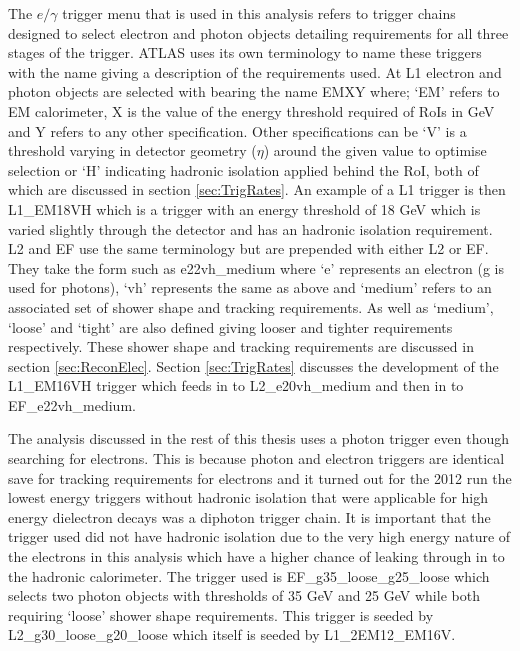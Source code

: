 		The $e/\gamma$ trigger menu that is used in this analysis refers to trigger chains designed to select electron and photon objects detailing requirements for all three stages of the trigger. ATLAS uses its own terminology to name these triggers with the name giving a description of the requirements used. At L1 electron and photon objects are selected with bearing the name EMXY where; `EM' refers to EM calorimeter, X is the value of the energy threshold required of RoIs in GeV and Y refers to any other specification. Other specifications can be `V' is a threshold varying in detector geometry ($\eta$) around the given value to optimise selection or `H' indicating hadronic isolation applied behind the RoI, both of which are discussed in section \ref{sec:TrigRates}. An example of a L1 trigger is then L1\_EM18VH which is a trigger with an energy threshold of 18 GeV which is varied slightly through the detector and has an hadronic isolation requirement. L2 and EF use the same terminology but are prepended with either L2 or EF. They take the form such as e22vh\_medium where `e' represents an electron (g is used for photons), `vh' represents the same as above and `medium' refers to an associated set of shower shape and tracking requirements. As well as `medium', `loose' and `tight' are also defined giving looser and tighter requirements respectively. These shower shape and tracking requirements are discussed in section \ref{sec:ReconElec}. Section \ref{sec:TrigRates} discusses the development of the L1\_EM16VH trigger which feeds in to L2\_e20vh\_medium and then in to EF\_e22vh\_medium. 

		The analysis discussed in the rest of this thesis uses a photon trigger even though searching for electrons. This is because photon and electron triggers are identical save for tracking requirements for electrons and it turned out for the 2012 run the lowest energy triggers without hadronic isolation that were applicable for high energy dielectron decays was a diphoton trigger chain. It is important that the trigger used did not have hadronic isolation due to the very high energy nature of the electrons in this analysis which have a higher chance of leaking through in to the hadronic calorimeter. The trigger used is EF\_g35\_loose\_g25\_loose which selects two photon objects with thresholds of 35 GeV and 25 GeV while both requiring `loose' shower shape requirements. This trigger is seeded by L2\_g30\_loose\_g20\_loose which itself is seeded by L1\_2EM12\_EM16V.



